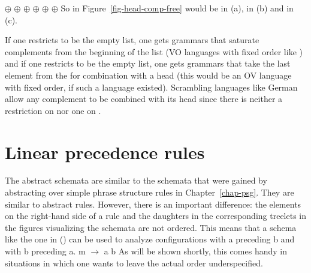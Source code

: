 \eal
\ex \eliste{} $\oplus$  $\oplus$  
\ex {} $\oplus$  $\oplus$  
\ex {} $\oplus$  $\oplus$ \eliste 
\zl
So  in Figure~\ref{fig-head-comp-free} would be \npnom in (a), \npdat in (b) and \npacc in (c).

If one restricts  to be the
empty list, one gets grammars that saturate complements from the beginning of the list (VO languages
with fixed order like ) and if one restricts  to be the empty list, one gets grammars that take the last
element from the \compsl for combination with a head (this would be an OV language with fixed
order, if such a language existed). Scrambling languages like German allow any
complement to be combined with its head since there is neither a restriction on  nor one on .%


\section{Linear precedence rules}
\label{sec-lp-rules}

The abstract schemata are similar to the schemata that were gained by abstracting over simple phrase
structure rules in Chapter~\ref{chap-psg}. They are similar to abstract \xbar rules. However, there
is an important difference: the elements on the right-hand side of a rule and the daughters in the
corresponding treelets in the figures visualizing the schemata are not ordered. This means that a
schema like the one in () can be used to analyze configurations with a preceding b and with
b preceding a.
\ea
m $\to$ a b
\z
As will be shown shortly, this comes handy in situations in which one wants to leave the actual
order underspecified.


